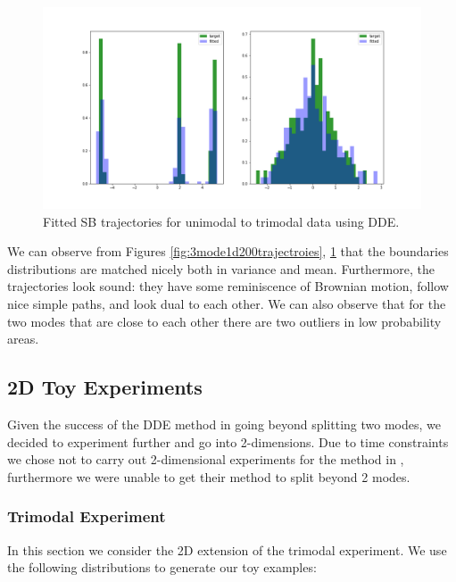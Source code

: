 \documentclass[a4paper,12pt,twoside,openright]{report}
\theoremstyle{definition}
\begin{document}
\begin{figure}
    \centering
    \includegraphics[scale=0.3,trim={2.3cm 1cm 2.5cm 0}, clip]{images/GP/gp_3_mode_200_boundaires.png}
    \caption{ Fitted SB trajectories for unimodal to trimodal data using DDE.  }
    \label{fig:3mode1d200boundaries}
\end{figure}
We can observe from Figures \ref{fig:3mode1d200trajectroies}, \ref{fig:3mode1d200boundaries} that the boundaries distributions are matched  nicely both in variance and mean. Furthermore, the trajectories look sound: they have some reminiscence of Brownian motion, follow nice simple paths, and look dual to each other. We can also observe that for the two modes that are close to each other there are two outliers in low probability areas.
\subsection{2D Toy Experiments}

Given the success of the DDE method in going beyond splitting two modes, we decided to experiment further and go into 2-dimensions. Due to time constraints we chose not to carry out 2-dimensional experiments for the method in \cite{pavon2018data}, furthermore we were unable to get their method to split beyond 2 modes. 

\subsubsection{Trimodal Experiment}
In this section we consider the 2D extension of the trimodal experiment.   We use the following distributions to generate our toy examples:
\end{document}
